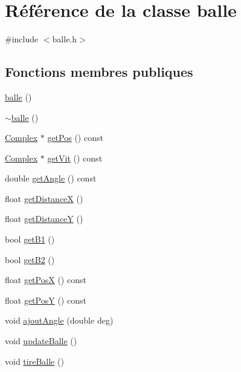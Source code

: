 \hypertarget{classballe}{}\section{Référence de la classe balle}
\label{classballe}


{\ttfamily \#include $<$balle.\+h$>$}

\subsection*{Fonctions membres publiques}
\begin{DoxyCompactItemize}
\item 
\hyperlink{classballe_a920553f18fd7e691bb8fb3fed24d7f40}{balle} ()
\item 
\hyperlink{classballe_a25f4ff369af6e6dcfb19c5f1464309fc}{$\sim$balle} ()
\item 
\hyperlink{classComplex}{Complex} $\ast$ \hyperlink{classballe_aa06115d8837256988e7ab9993f47ac6f}{get\+Pos} () const
\item 
\hyperlink{classComplex}{Complex} $\ast$ \hyperlink{classballe_a9ca7c6c93dcc2334718e21a1c9ee2b86}{get\+Vit} () const
\item 
double \hyperlink{classballe_a936eca3095fe64cc005421f3ad9fd3f3}{get\+Angle} () const
\item 
float \hyperlink{classballe_a3bc8bc6662c95bd052f02dfb18892209}{get\+DistanceX} ()
\item 
float \hyperlink{classballe_a086e3e6d1814e885c849e8ea4813a0a2}{get\+DistanceY} ()
\item 
bool \hyperlink{classballe_a4a4b1a63e53cd0d766fce1e49cc07b17}{get\+B1} ()
\item 
bool \hyperlink{classballe_a87d391536126876825f2e6b57453b973}{get\+B2} ()
\item 
float \hyperlink{classballe_a1e62142738138ef4b0fc6fe97c18ea70}{get\+PosX} () const
\item 
float \hyperlink{classballe_a44f9ef55a50756bf8414e407b2670132}{get\+PosY} () const
\item 
void \hyperlink{classballe_ac2beb3bc9905e417d165aa0c454c152f}{ajout\+Angle} (double deg)
\item 
void \hyperlink{classballe_a4bbd5e8cc842b10009b279d77d7272ef}{update\+Balle} ()
\item 
void \hyperlink{classballe_a05c341df96e2a49b08e8a77c9a6806db}{tire\+Balle} ()
\end{DoxyCompactItemize}


